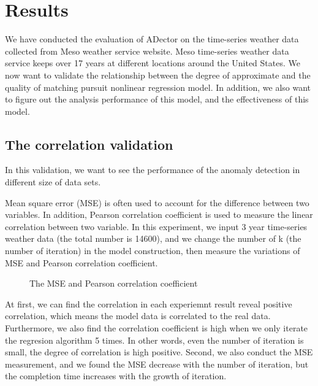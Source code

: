 \documentclass{vgtc}                          %
\begin{document}
\section{Results}

We have conducted the evaluation of ADector on the time-series weather data collected from Meso weather service website. Meso time-series weather data service keeps over 17 years at different locations around the United States. We now want to validate the relationship between the degree of approximate and the quality of matching pursuit nonlinear regression model. In addition, we also want to figure out the analysis performance of this model, and the effectiveness of this model.

\subsection{The correlation validation}

	In this validation, we want to see the performance of the anomaly detection in different size of data sets. 

Mean square error (MSE) is often used to account for the difference between two variables. In addition, Pearson correlation coefficient is used to measure the linear correlation between two variable. In this experiment, we input 3 year time-series weather data (the total number is 14600), and we change the number of k (the number of iteration) in the model construction, then measure the variations of MSE and Pearson correlation coefficient. 
\begin{figure}[htb]
	\caption{The MSE and Pearson correlation coefficient}
\end{figure}

	At first, we can find the correlation in each experiemnt result reveal positive correlation, which means the model data is correlated to the real data. Furthermore, we also find the correlation coefficient is high when we only iterate the regresion algorithm 5 times. In other words, even the number of iteration is small, the degree of correlation is high positive. Second, we also conduct the MSE measurement, and we found the MSE decrease with the number of iteration, but the completion time increases with the growth of iteration.
	
\end{document}
